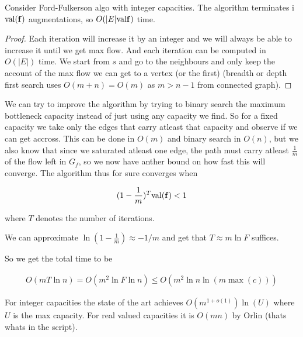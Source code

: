 \begin{lema}
    Consider Ford-Fulkerson algo with integer capacities. The algorithm terminates i $\text{val}(\mathbf{f})$ augmentations, so $O(|E| \text{val} \mathbf{f})$ time.
\end{lema}

\begin{proof}
    Each iteration will increase it by an integer and we will always be able to increase it until we get max flow. And each iteration can be computed in $O(|E|)$ time. We start from $s$ and go to the neighbours and only keep the account of the max flow we can get to a vertex (or the first) (breadth or depth first search uses $O(m+n) = O(m)$ as $m>n-1$ from connected graph).
\end{proof}


We can try to improve the algorithm by trying to binary search the maximum bottleneck capacity instead of just using any capacity we find. So for a fixed capacity we take only the edges that carry atleast that capacity and observe if we can get accross. This can be done in $O(m)$ and binary search in $O(n)$, but we also know that since we saturated atleast one edge, the path must carry atleast $\frac 1 m$ of the flow left in $G_f$, so we now have anther bound on how fast this will converge. The algorithm thus for sure converges when

\begin{align*}
    (1 - \frac 1 m) ^T \text{val}(\mathbf{f}) <1
\end{align*}

where $T$ denotes the number of iterations.

We can approximate $\ln (1-\frac 1 m) \approx -1/m$ and get that $T \approx m \ln F$ suffices.

So we get the total time to be

\begin{align}
    O(m T \ln n) = O(m ^2 \ln F \ln n) \leq O(m^2 \ln n \ln (m \max (c)))
\end{align}

For integer capacities the state of the art achieves $O(m^{1 + o(1)}) \ln (U)$ where $U$ is the max capacity. For real valued capacities it is $O(mn)$ by Orlin (thats whats in the script).












